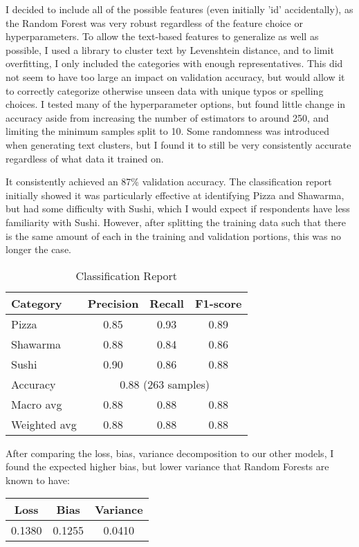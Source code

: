 I decided to include all of the possible features (even initially 'id' accidentally), as the Random Forest was very robust regardless of the feature choice or hyperparameters. To allow the text-based features to generalize as well as possible, I used a library to cluster text by Levenshtein distance, and to limit overfitting, I only included the categories with enough representatives. This did not seem to have too large an impact on validation accuracy, but would allow it to correctly categorize otherwise unseen data with unique typos or spelling choices.
I tested many of the hyperparameter options, but found little change in accuracy aside from increasing the number of estimators to around 250, and limiting the minimum samples split to 10. Some randomness was introduced when generating text clusters, but I found it to still be very consistently accurate regardless of what data it trained on.

It consistently achieved an 87\% validation accuracy. The classification report initially showed it was particularly effective at identifying Pizza and Shawarma, but had some difficulty with Sushi, which I would expect if respondents have less familiarity with Sushi. However, after splitting the training data such that there is the same amount of each in the training and validation portions, this was no longer the case.
\begin{table}[h]
    \centering
    \begin{tabular}{lccc}
        \hline
        Category & Precision & Recall & F1-score \\ 
        \hline
        Pizza    & 0.85 & 0.93 & 0.89 \\
        Shawarma & 0.88 & 0.84 & 0.86 \\
        Sushi    & 0.90 & 0.86 & 0.88 \\
        \hline
        Accuracy      & \multicolumn{3}{c}{0.88 (263 samples)} \\
        Macro avg     & 0.88 & 0.88 & 0.88 \\
        Weighted avg  & 0.88 & 0.88 & 0.88 \\
        \hline
    \end{tabular}
    \caption{Classification Report}
    \label{tab:classification_report}
\end{table}

After comparing the loss, bias, variance decomposition to our other models, I found the expected higher bias, but lower variance that Random Forests are known to have:
\begin{table}[h]
    \centering
    \begin{tabular}{ccc}
        \hline
        Loss & Bias & Variance \\ 
        \hline
        0.1380 & 0.1255 & 0.0410 \\
        \hline
    \end{tabular}
    \label{tab:loss_report}
\end{table}
